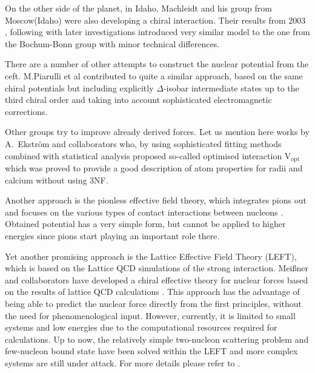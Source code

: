 On the other side of the planet, in Idaho, Machleidt and his group from Moscow(Idaho) were also developing 
a chiral interaction. Their results from 2003 \cite{Entem2003}, following with later 
investigations \cite{Machleidt2005, Machleidt2010, Entem2017} introduced very similar model
to the one from the Bochum-Bonn
group with minor technical differences.


There are a number of other attempts to construct the nuclear
potential from the \gls{ceft}.
M.Piarulli et al \cite{Piarulli2012,Piarulli2015} contributed
to quite a similar approach, based on
the same chiral potentials but including explicitly 
$\Delta$-isobar intermediate states 
up to the third chiral order and taking into account
sophisticated electromagnetic corrections.

Other groups try to improve already derived forces.
Let us mention here works by A.~Ekstr\"om and
collaborators \cite{ekstrom_2015, Tews_2020} who,
by using sophisticated fitting methods combined with
statistical analysis proposed so-called optimised interaction
V$_\text{opt}$ which was proved to provide a good description
of atom properties for radii and calcium without
using 3NF.

Another approach is the pionless effective field
theory, which integrates pions out and
focuses on the various types of contact
interactions between nucleons \cite{hammer_review}.
Obtained potential has a very simple form, but cannot be applied
to higher energies since pions start playing an important role
there.

Yet another promising approach is the Lattice Effective Field Theory (LEFT), which
is based on the Lattice QCD simulations of the strong
interaction. Mei\ss{}ner and collaborators have developed a chiral effective
theory for nuclear forces based on the results of lattice QCD
calculations \cite{Lande2019}. This approach has the advantage of being able
to predict the nuclear force directly from the first
principles, without the need for phenomenological input. However, currently, it is limited
to small systems and low energies due to the computational
resources required for calculations.
Up to now, the relatively simple two-nucleon scattering problem
and few-nucleon bound state
have been solved within the LEFT and more complex systems are
still under attack. 
For more details please refer to
\cite{Lande2019}.


